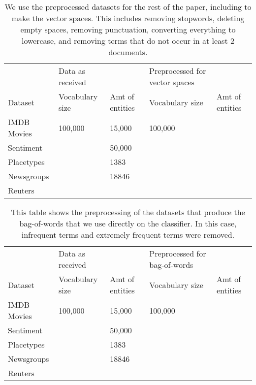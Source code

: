 \begin{table}[]
	\begin{tabular}{lllll}
		& Data as received &                 & Preprocessed for vector spaces &                 \\
		Dataset     & Vocabulary size  & Amt of entities & Vocabulary size                & Amt of entities \\
		IMDB Movies & 100,000          & 15,000          & 100,000                        &                 \\
		Sentiment   &                  & 50,000          &                                &                 \\
		Placetypes  &                  & 1383            &                                &                 \\
		Newsgroups  &                  & 18846           &                                &                 \\
		Reuters     &                  &                 &                                &                
	\end{tabular}
	\caption{We use the preprocessed datasets for the rest of the paper, including to make the vector spaces. This includes removing stopwords, deleting empty spaces, removing punctuation, converting everything to lowercase, and removing terms that do not occur in at least 2 documents.}  
	\label{table:DatasetStats}
\end{table}

\begin{table}[]
	\begin{tabular}{lllll}
		& Data as received &                 & Preprocessed for bag-of-words &                 \\
		Dataset     & Vocabulary size  & Amt of entities & Vocabulary size                & Amt of entities \\
		IMDB Movies & 100,000          & 15,000          & 100,000                        &                 \\
		Sentiment   &                  & 50,000          &                                &                 \\
		Placetypes  &                  & 1383            &                                &                 \\
		Newsgroups  &                  & 18846           &                                &                 \\
		Reuters     &                  &                 &                                &                
	\end{tabular}
	\caption{This table shows the preprocessing of the datasets that produce the bag-of-words that we use directly on the classifier. In this case, infrequent terms and extremely frequent terms were removed.}
	\label{table:BowStats}
\end{table}

